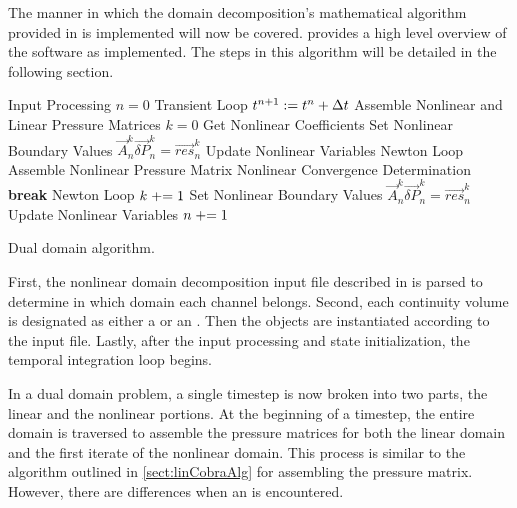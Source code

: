 The manner in which the domain decomposition's mathematical algorithm provided in \sect{} is implemented will now be covered.
 provides a high level overview of the software as implemented.
The steps in this algorithm will be detailed in the following section.

\begin{algo}[ht!]
\setlength{\baselineskip}{0.625\baselineskip}
\begin{algorithmic}[1]
\Require Input Processing
\Set $n = 0$
\Loop \; Transient Loop
    \Set $t^{n+1} : = t^{n} + \dt{}$
	\Algorithm Assemble Nonlinear and Linear Pressure Matrices	 
	    \Set $k = 0$
		\Algorithm Get Nonlinear Coefficients 
		\Algorithm Set Nonlinear Boundary Values 
		\Solve $\vec{A}^{k}_{n} \vec{\delta P}_{n}^{k} = \vec{res}_{n}^{k}$	
		\Algorithm Update Nonlinear Variables  
	    \Loop \; Newton Loop
			\Algorithm Assemble Nonlinear Pressure Matrix 
			\Algorithm Nonlinear Convergence Determination 
				\State \textbf{break} Newton Loop 
			\EndIf		
			\Set $k \mathrel{+}= 1$
			\Algorithm Set Nonlinear Boundary Values 
			\Solve $\vec{A}_{n}^{k} \vec{\delta P}_{n}^{k} = \vec{res}_{n}^{k}$
			\Algorithm Update Nonlinear Variables 
		\EndLoop
	\EndIf
	 
	\Set $n \mathrel{+}= 1$
\EndLoop
\end{algorithmic}
\caption{Dual domain \cobra{} algorithm.}
\label{alg:domDecompAlgorithm}
\end{algo}

First, the nonlinear domain decomposition input file described in  is parsed to determine in which domain each channel belongs.
Second, each continuity volume is designated as either a  or an .
Then the  objects are instantiated according to the \cobra{} input file.
Lastly, after the input processing and state initialization, the temporal integration loop begins.

In a dual domain problem, a single timestep is now broken into two parts, the linear and the nonlinear portions.
At the beginning of a timestep, the entire domain is traversed to assemble the pressure matrices for both the linear domain and the first iterate of the nonlinear domain.
This process is similar to the algorithm outlined in \ref{sect:linCobraAlg} for assembling the pressure matrix.
However, there are differences when an  is encountered.

